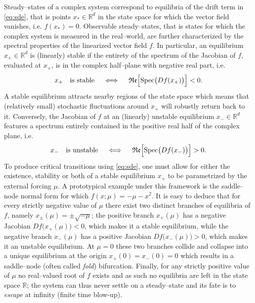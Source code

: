 Steady--states of a complex system correspond to equilibria of the drift term in \eqref{eq:sde}, that is points $x_*\in\mathbb{R}^{d}$ in the state space for which the vector field vanishes, i.e. $f(x_*)=0$.
Observable steady--states, that is states for which the complex system is measured in the real--world, are further characterized by the spectral properties of the linearized vector field $f$.
In particular, an equilibrium $x_+\in \mathbb{R}^{d}$ is (linearly) stable if the entirety of the spectrum of the Jacobian of $f$, evaluated at $x_+$, is in the complex half--plane with negative real part, i.e.
%
\begin{equation}\label{eq:stable_equilibrium}
  x_+\quad \text{is stable}\quad \iff \quad \mathfrak{Re}\Bigl[\operatorname{Spec}\bigl(Df(x_+)\bigr)\Bigr] < 0.
\end{equation}
%
A stable equilibrium attracts nearby regions of the state space which means that (relatively small) stochastic fluctuations around $x_+$ will robustly return back to it.
Conversely, the Jacobian of $f$ at an (linearly) unstable equilibrium $x_-\in\mathbb{R}^{d}$ features a spectrum entirely contained in the positive real half of the complex plane, i.e.
%
\begin{equation}\label{eq:unstable_equilibrium}
  x_-\quad \text{is unstable}\quad \iff \quad \mathfrak{Re}\Bigl[\operatorname{Spec}\bigl(Df(x_-)\bigr)\Bigr] > 0.
\end{equation}
%
To produce critical transitions using \eqref{eq:sde}, one must allow for either the existence, stability or both of a stable equilibrium $x_+$ to be parametrized by the external forcing $\mu$.
A prototypical example under this framework is the saddle--node normal form for which $f(x;\mu) = -\mu - x^2$.
It is easy to deduce that for every strictly negative value of $\mu$ there exist two distinct branches of equilibria of $f$, namely $x_{\pm}(\mu) = \pm\sqrt{-\mu}$; the positive branch $x_+(\mu)$ has a negative Jacobian $Df\bigl(x_+(\mu)\bigr)<0$, which makes it a stable equilibrium, while the negative branch $x_-(\mu)$ has a positive Jacobian $Df\bigl(x_-(\mu)\bigr)>0$, which makes it an unstable equilibrium.
At $\mu=0$ these two branches collide and collapse into a unique equilibrium at the origin $x_+(0)=x_-(0)=0$ which results in a saddle--node (often called \emph{fold}) bifurcation. 
Finally, for any strictly positive value of $\mu$ no real--valued root of $f$ exists and as such no equilibria are left in the state space $\mathbb{R}$; the system can thus never settle on a steady--state and its fate is to \emph{escape} at infinity (finite time blow-up).

